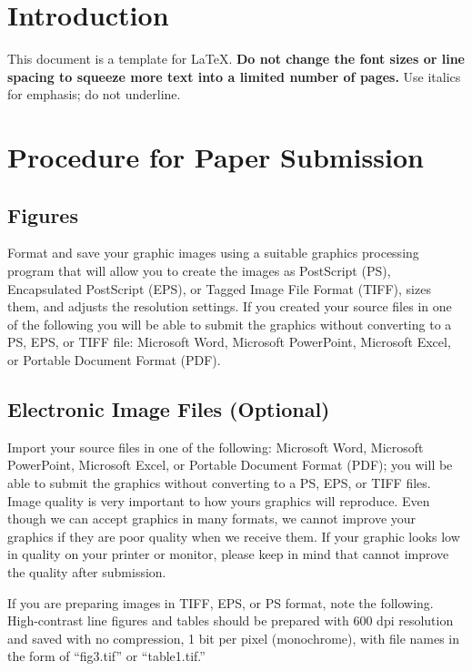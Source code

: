 \documentclass[journal,a4paper,onecolumn]{IEEEtran}
\begin{document}
\section{Introduction}

This document is a template for \LaTeX. \textbf{Do not change the font sizes or line spacing to squeeze more text into a limited number of pages.} Use italics for emphasis; do not underline.

\section{Procedure for Paper Submission}

\subsection{Figures}

Format and save your graphic images using a suitable graphics processing program that will allow you to create the images as PostScript (PS), Encapsulated PostScript (EPS), or Tagged Image File Format (TIFF), sizes them, and adjusts the resolution settings. If you created your source files in one of the following you will be able to submit the graphics without converting to a PS, EPS, or TIFF file: Microsoft Word, Microsoft PowerPoint, Microsoft Excel, or Portable Document Format (PDF).

\subsection{Electronic Image Files (Optional)}

Import your source files in one of the following: Microsoft Word, Microsoft PowerPoint, Microsoft Excel, or Portable Document Format (PDF); you will be able to submit the graphics without converting to a PS, EPS, or TIFF files. Image quality is very important to how yours graphics will reproduce. Even though we can accept graphics in many formats, we cannot improve your graphics if they are poor quality when we receive them. If your graphic looks low in quality on your printer or monitor, please keep in mind that cannot improve the quality after submission.

If you are preparing images in TIFF, EPS, or PS format, note the following. High-contrast line figures and tables should be prepared with 600 dpi resolution and saved with no compression, 1 bit per pixel (monochrome), with file names in the form of ``fig3.tif'' or ``table1.tif.''
\end{document}
